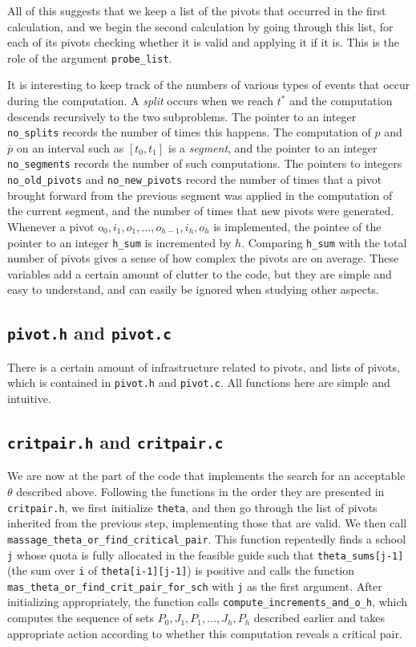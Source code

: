 \documentclass[12pt]{article}
\theoremstyle{definition}
\newcommand{\barp}{\overline{p}}
\begin{document}
\begin{appendix}
All of this suggests that we keep a list of the pivots that occurred
in the first calculation, and we begin the second calculation by going
through this list, for each of its pivots checking whether it is valid
and applying it if it is.  This is the role of the argument \texttt{probe\_list}.

It is interesting to keep track of the numbers of various types of
events that occur during the computation.  A \emph{split} occurs when
we reach $t^*$ and the computation descends recursively to the two
subproblems.  The pointer to an integer \texttt{no\_splits} records
the number of times this happens.  The computation of $p$ and $\barp$
on an interval such as $[t_0,t_1]$ is a \emph{segment}, and the
pointer to an integer \texttt{no\_segments} records the number of such
computations.  The pointers to integers \texttt{no\_old\_pivots} and
\texttt{no\_new\_pivots} record the number of times that a pivot
brought forward from the previous segment was applied in the
computation of the current segment, and the number of times that new
pivots were generated.  Whenever a pivot $o_0,i_1,o_1, \ldots,
o_{h-1},i_h, o_h$ is implemented, the pointee of the pointer to an
integer \texttt{h\_sum} is incremented by $h$.  Comparing
\texttt{h\_sum} with the total number of pivots gives a sense of how
complex the pivots are on average.  These variables add a certain
amount of clutter to the code, but they are simple and easy to
understand, and can easily be ignored when studying other aspects.

\subsection{\texttt{pivot.h} and \texttt{pivot.c}}

There is a certain amount of infrastructure related to pivots, and
lists of pivots, which is contained in \texttt{pivot.h} and
\texttt{pivot.c}.  All functions here are simple and intuitive.

\subsection{\texttt{critpair.h} and \texttt{critpair.c}}

We are now at the part of the code that implements the search for an
acceptable $\theta$ described above.  Following the functions in the
order they are presented in \texttt{critpair.h}, we first initialize
\texttt{theta}, and then go through the list of pivots inherited from
the previous step, implementing those that are valid.  We then call
\texttt{massage\_theta\_or\_find\_critical\_pair}.  This function
repeatedly finds a school \texttt{j} whose quota is fully allocated in
the feasible guide such that \texttt{theta\_sums[j-1]} (the sum over
\texttt{i} of \texttt{theta[i-1][j-1]}) is positive and calls the
function \texttt{mas\_theta\_or\_find\_crit\_pair\_for\_sch} with
\texttt{j} as the first argument.  After initializing appropriately,
the function calls \texttt{compute\_increments\_and\_o\_h}, which
computes the sequence of sets $P_0, J_1, P_1, \ldots, J_h, P_h$
described earlier and takes appropriate action according to whether
this computation reveals a critical pair.

\end{appendix}



\end{document}

